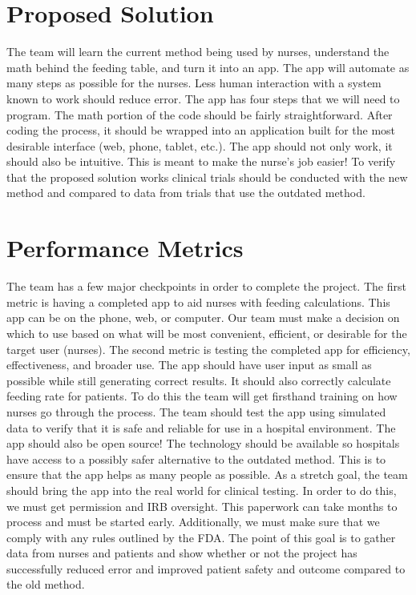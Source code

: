 \documentclass[fullpage,10pt, onecolumn, draftclsnofoot]{IEEEtran}
\begin{document}
\section{Proposed Solution}
The team will learn the current method being used by nurses, understand the math behind the feeding table, and turn it into an app. The app will automate as many steps as possible for the nurses. Less human interaction with a system known to work should reduce error. 
\newline The app has four steps that we will need to program. The math portion of the code should be fairly straightforward. After coding the process, it should be wrapped into an application built for the most desirable interface (web, phone, tablet, etc.). The app should not only work, it should also be intuitive. This is meant to make the nurse's job easier! To verify that the proposed solution works clinical trials should be conducted with the new method and compared to data from trials that use the outdated method.

\section{Performance Metrics}
The team has a few major checkpoints in order to complete the project. The first metric is having a completed app to aid nurses with feeding calculations. This app can be on the phone, web, or computer. Our team must make a decision on which to use based on what will be most convenient, efficient, or desirable for the target user (nurses). The second metric is testing the completed app for efficiency, effectiveness, and broader use. 
\newline The app should have user input as small as possible while still generating correct results. It should also correctly calculate feeding rate for patients. To do this the team will get firsthand training on how nurses go through the process. The team should test the app using simulated data to verify that it is safe and reliable for use in a hospital environment. 
\newline The app should also be open source! The technology should be available so hospitals have access to a possibly safer alternative to the outdated method. This is to ensure that the app helps as many people as possible. 
\newline As a stretch goal, the team should bring the app into the real world for clinical testing. In order to do this, we must get permission and IRB oversight. This paperwork can take months to process and must be started early. Additionally, we must make sure that we comply with any rules outlined by the FDA. The point of this goal is to gather data from nurses and patients and show whether or not the project has successfully reduced error and improved patient safety and outcome compared to the old method. 
\end{document}
